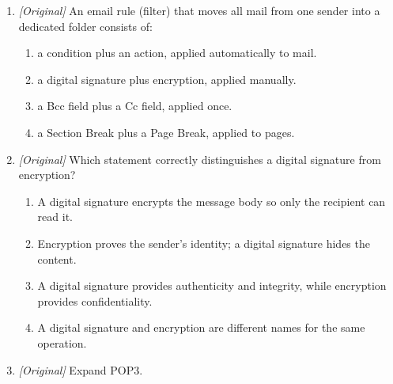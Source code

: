 \documentclass[11pt]{article}
\begin{document}
\begin{enumerate}[label=\textbf{Q\arabic*.}, leftmargin=*]
  \begin{enumerate}[label=\Roman*.]
    \item COUNTIFS counts only the rows satisfying all the given
      range-and-criteria pairs.
    \item SUMPRODUCT can only add numbers and cannot count rows meeting
      multiple conditions.
    \item In a numeric comparison, a blank cell is treated as zero.
  \end{enumerate}
  \begin{enumerate}[label=\Alph*.]
    \item I and III only
    \item II only
    \item I, II, and III
    \item I and II only
  \end{enumerate}
\item \textit{[Original]} An email rule (filter) that moves all mail from one
  sender into a dedicated folder consists of:
  \begin{enumerate}[label=\Alph*.]
    \item a condition plus an action, applied automatically to mail.
    \item a digital signature plus encryption, applied manually.
    \item a Bcc field plus a Cc field, applied once.
    \item a Section Break plus a Page Break, applied to pages.
  \end{enumerate}
\item \textit{[Original]} Which statement correctly distinguishes a digital
  signature from encryption?
  \begin{enumerate}[label=\Alph*.]
    \item A digital signature encrypts the message body so only the recipient
      can read it.
    \item Encryption proves the sender's identity; a digital signature hides
      the content.
    \item A digital signature provides authenticity and integrity, while
      encryption provides confidentiality.
    \item A digital signature and encryption are different names for the same
      operation.
  \end{enumerate}
\item \textit{[Original]} Expand POP3.
  \begin{enumerate}[label=\Alph*.]

\end{enumerate}
\end{enumerate}
\end{document}
